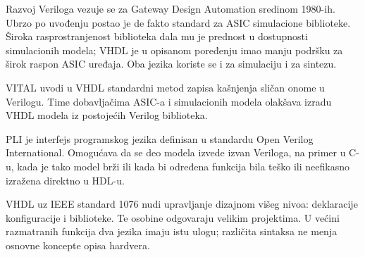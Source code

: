 Razvoj Veriloga vezuje se za Gateway Design Automation sredinom 1980-ih. Ubrzo po uvođenju postao je de fakto standard za ASIC simulacione biblioteke. Široka rasprostranjenost biblioteka dala mu je prednost u dostupnosti simulacionih modela; VHDL je u opisanom poređenju imao manju podršku za širok raspon ASIC uređaja. Oba jezika koriste se i za simulaciju i za sintezu.

VITAL uvodi u VHDL standardni metod zapisa kašnjenja sličan onome u Verilogu. Time dobavljačima ASIC-a i simulacionih modela olakšava izradu VHDL modela iz postojećih Verilog biblioteka.

PLI je interfejs programskog jezika definisan u standardu Open Verilog International. Omogućava da se deo modela izvede izvan Veriloga, na primer u C-u, kada je tako model brži ili kada bi određena funkcija bila teško ili neefikasno izražena direktno u HDL-u.

VHDL uz IEEE standard 1076 nudi upravljanje dizajnom višeg nivoa: deklaracije konfiguracije i biblioteke. Te osobine odgovaraju velikim projektima. U većini razmatranih funkcija dva jezika imaju istu ulogu; različita sintaksa ne menja osnovne koncepte opisa hardvera.
